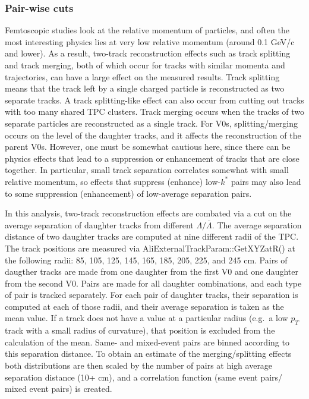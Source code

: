 \subsubsection{Pair-wise cuts}
\label{sec:PairWiseCuts}

Femtoscopic studies look at the relative momentum of particles, and often the most interesting physics lies at very low relative momentum (around 0.1 GeV/c and lower).  
As a result, two-track reconstruction effects such as track splitting and track merging, both of which occur for tracks with similar momenta and trajectories, can have a large effect on the measured results.  
Track splitting means that the track left by a single charged particle is reconstructed as two separate tracks. 
A track splitting-like effect can also occur from cutting out tracks with too many shared TPC clusters.
Track merging occurs when the tracks of two separate particles are reconstructed as a single track.  
For V0s, splitting/merging occurs on the level of the daughter tracks, and it affects the reconstruction of the parent V0s.
However, one must be somewhat cautious here, since there can be physics effects that lead to a suppression or enhancement of tracks that are close together.
In particular, small track separation correlates somewhat with small relative momentum, so effects that suppress (enhance) low-$k^*$ pairs may also lead to some suppression (enhancement) of low-average separation pairs.  

In this analysis, two-track reconstruction effects are combated via a cut on the average separation of daughter tracks from different $\Lambda/\bar{\Lambda}$.  
The average separation distance of two daughter tracks are computed at nine different radii of the TPC.  
The track positions are measured via AliExternalTrackParam::GetXYZatR() at the following radii: 85, 105, 125, 145, 165, 185, 205, 225, and 245 cm.  
Pairs of daugther tracks are made from one daughter from the first V0 and one daughter from the second V0. Pairs are made for all daughter combinations, and each type of pair is tracked separately.
For each pair of daughter tracks, their separation is computed at each of those radii, and their average separation is taken as the mean value. If a track does not have a value at a particular radius (e.g.\ a low $p_T$ track with a small radius of curvature), that position is excluded from the calculation of the mean.
Same- and mixed-event pairs are binned according to this separation distance.  
To obtain an estimate of the merging/splitting effects both distributions are then scaled by the number of pairs at high average separation distance (10+ cm), and a correlation function (same event pairs/ mixed event pairs) is created. 

